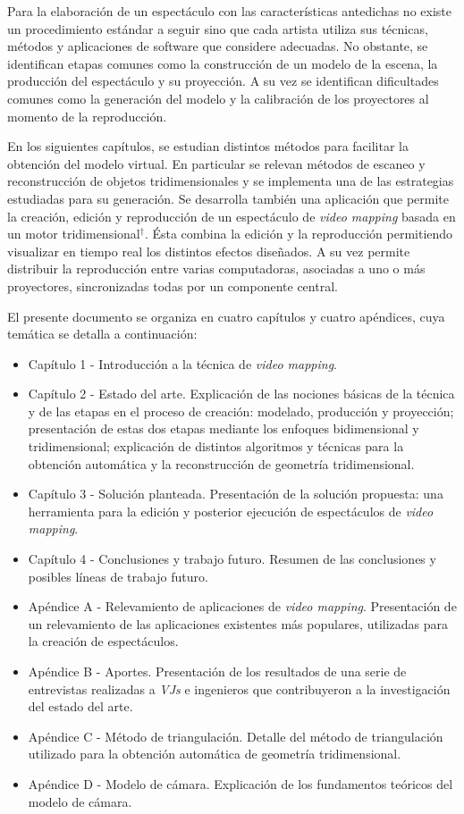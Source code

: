 Para la elaboración de un espectáculo con las características antedichas no existe un procedimiento estándar a seguir sino que cada artista utiliza sus técnicas, métodos y aplicaciones de software que considere adecuadas. No obstante, se identifican etapas comunes como la construcción de un modelo de la escena, la producción del espectáculo y su proyección. A su vez se identifican dificultades comunes como la generación del modelo y la calibración de los proyectores al momento de la reproducción.

En los siguientes capítulos, se estudian distintos métodos para facilitar la obtención del modelo virtual. En particular se relevan métodos de escaneo y reconstrucción de objetos tridimensionales y se implementa una de las estrategias estudiadas para su generación.
Se desarrolla también una aplicación que permite la creación, edición y reproducción de un espectáculo de \emph{video mapping} basada en un motor tridimensional$^\dagger$. Ésta combina la edición y la reproducción permitiendo visualizar en tiempo real los distintos efectos diseñados. A su vez permite distribuir la reproducción entre varias computadoras, asociadas a uno o más proyectores, sincronizadas todas por un componente central.

El presente documento se organiza en cuatro capítulos y cuatro apéndices, cuya temática se detalla a continuación:
\begin{itemize}
\item Capítulo 1 - Introducción a la técnica de \emph{video mapping}.
\item Capítulo 2 - Estado del arte. Explicación de las nociones básicas de la técnica y de las etapas en el proceso de creación: modelado, producción y proyección; presentación de estas dos etapas mediante los enfoques bidimensional y tridimensional; explicación de distintos algoritmos y técnicas para la obtención automática y la reconstrucción de geometría tridimensional.
\item Capítulo 3 - Solución planteada. Presentación de la solución propuesta: una herramienta para la edición y posterior ejecución de espectáculos de \emph{video mapping}.
\item Capítulo 4 - Conclusiones y trabajo futuro. Resumen de las conclusiones y posibles líneas de trabajo futuro.
\item Apéndice A - Relevamiento de aplicaciones de \emph{video mapping}. Presentación de un relevamiento de las aplicaciones existentes más populares, utilizadas para la creación de espectáculos.
\item Apéndice B - Aportes. Presentación de los resultados de una serie de entrevistas realizadas a \emph{VJs} e ingenieros que contribuyeron a la investigación del estado del arte.
\item Apéndice C - Método de triangulación. Detalle del método de triangulación utilizado para la obtención automática de geometría tridimensional.
\item Apéndice D - Modelo de cámara. Explicación de los fundamentos teóricos del modelo de cámara.
\end{itemize}